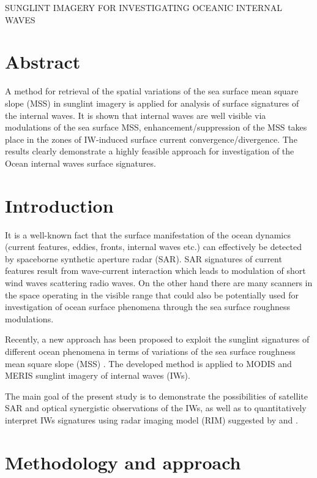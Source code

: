 \documentclass{report}
\begin{document}
SUNGLINT IMAGERY FOR INVESTIGATING OCEANIC INTERNAL WAVES

\section{Abstract}

A method for retrieval of the spatial variations of the sea surface mean square slope (MSS) in sunglint imagery is applied for analysis of surface signatures of the internal waves. It is shown that internal waves are well visible via modulations of the sea surface MSS, enhancement/suppression of the MSS takes place in the zones of IW-induced surface current convergence/divergence. The results clearly demonstrate a highly feasible approach for investigation of the Ocean internal waves surface signatures.


\section{Introduction}

It is a well-known fact that the surface manifestation of the ocean dynamics (current features, eddies, fronts, internal waves etc.) can effectively be detected by spaceborne synthetic aperture radar (SAR). SAR signatures of current features result from wave-current interaction which leads to modulation of short wind waves scattering radio waves. On the other hand there are many scanners in the space operating in the visible range that could also be potentially used for investigation of ocean surface phenomena through the sea surface roughness modulations.

Recently, a new approach has been proposed to exploit the sunglint signatures of different ocean phenomena in terms of variations of the sea surface roughness mean square slope (MSS) \citep{Kudryavtsev2012a}. The developed method is applied to MODIS and MERIS sunglint imagery of internal waves (IWs). 

The main goal of the present study is to demonstrate the possibilities of satellite SAR and optical synergistic observations of the IWs, as well as to quantitatively interpret IWs signatures using radar imaging model (RIM) suggested by \cite{Kudryavtsev2005} and \cite{Johannessen2005}.


\section{Methodology and approach}
\end{document}
